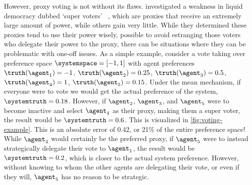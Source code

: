 
However, proxy voting is not without its flaws.
 investigated a weakness in liquid democracy dubbed `super voters'
~\cite[para.~1.3]{Kling2015}, which are proxies that receive an extremely large
amount of power, while others gain very little.
While they determined these proxies tend to use their power wisely, possible to avoid
estranging those voters who delegate their power to the proxy, there can be
situations where they can be problematic with one-off issues.
As a simple example, consider a vote taking over preference
space $\systemspace = [-1, 1]$ with agent preferences $\truthof{\agent_1} = -1$,
$\truthof{\agent_2} = 0.25$, $\truthof{\agent_3} = 0.5$, $\truthof{\agent_4} = 1$,
$\truthof{\agent_5} = 0.15$.
Under the mean mechanism, if everyone were to vote
we would get the actual preference of the system, $\systemtruth = 0.18$.
However, if $\agent_2$, $\agent_3$, and $\agent_5$ were to become inactive and select
$\agent_4$ as their proxy, making them a super voter, the result would be
$\systemtruth = 0.6$.
This is visualized in \autoref{fig:voting-example}.
This is an absolute error of 0.42, or 21\% of the entire preference space!
While $\agent_4$ would certainly be the preferred proxy, if $\agent_5$ were to
instead strategically delegate their vote to $\agent_1$, the result would
be $\systemtruth = 0.2$, which is closer to the actual system preference.
However, without knowing to whom the other agents are delegating their vote, or even
if they will, $\agent_5$ has no reason to be strategic.

